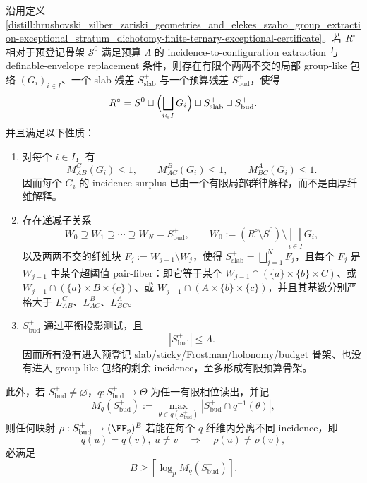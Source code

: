 \begin{theorem}\label{distill:hrushovski_zilber_zariski_geometries_and_elekes_szabo_group_extraction-exceptional_stratum_dichotomy-balanced-ternary-group-exceptional-decomposition}
沿用定义 \ref{distill:hrushovski_zilber_zariski_geometries_and_elekes_szabo_group_extraction-exceptional_stratum_dichotomy-finite-ternary-exceptional-certificate}。若 \(R^\circ\) 相对于预登记骨架 \(\mathcal S^0\) 满足预算 \(\Lambda\) 的 incidence-to-configuration extraction 与 definable-envelope replacement 条件，则存在有限个两两不交的局部 group-like 包络 \((G_i)_{i\in I}\)、一个 slab 残差 \(S_{\mathrm{slab}}^+\) 与一个预算残差 \(S_{\mathrm{bud}}^+\)，使得
\[
R^\circ
=
S^0\sqcup\Bigl(\bigsqcup_{i\in I}G_i\Bigr)\sqcup S_{\mathrm{slab}}^+\sqcup S_{\mathrm{bud}}^+.
\]
并且满足以下性质：
\begin{enumerate}
  \item 对每个 \(i\in I\)，有
  \[
  M_{AB}^{C}(G_i)\le 1,\qquad M_{AC}^{B}(G_i)\le 1,\qquad M_{BC}^{A}(G_i)\le 1.
  \]
  因而每个 \(G_i\) 的 incidence surplus 已由一个有限局部群律解释，而不是由厚纤维解释。
  \item 存在递减子关系
  \[
  W_0\supseteq W_1\supseteq\cdots\supseteq W_N=S_{\mathrm{bud}}^+,
  \qquad
  W_0:=(R^\circ\setminus S^0)\setminus\bigsqcup_{i\in I}G_i,
  \]
  以及两两不交的纤维块 \(F_j:=W_{j-1}\setminus W_j\)，使得
  \(S_{\mathrm{slab}}^+=\bigsqcup_{j=1}^{N}F_j\)，且每个 \(F_j\) 是 \(W_{j-1}\) 中某个超阈值 pair-fiber：即它等于某个
  \(W_{j-1}\cap(\{a\}\times\{b\}\times C)\)、或
  \(W_{j-1}\cap(\{a\}\times B\times\{c\})\)、或
  \(W_{j-1}\cap(A\times\{b\}\times\{c\})\)，并且其基数分别严格大于
  \(L_{AB}^{C}\)、\(L_{AC}^{B}\)、\(L_{BC}^{A}\)。
  \item \(S_{\mathrm{bud}}^+\) 通过平衡投影测试，且
  \[
  |S_{\mathrm{bud}}^+|\le \Lambda.
  \]
  因而所有没有进入预登记 slab/sticky/Frostman/holonomy/budget 骨架、也没有进入 group-like 包络的剩余 incidence，至多形成有限预算骨架。
\end{enumerate}
此外，若 \(S_{\mathrm{bud}}^+\ne\varnothing\)，\(q:S_{\mathrm{bud}}^+\to\Theta\) 为任一有限相位读出，并记
\[
M_q(S_{\mathrm{bud}}^+):=\max_{\theta\in q(S_{\mathrm{bud}}^+)} |S_{\mathrm{bud}}^+\cap q^{-1}(\theta)|,
\]
则任何映射 \(\rho:S_{\mathrm{bud}}^+\to(\FF_p)^B\) 若能在每个 \(q\)-纤维内分离不同 incidence，即
\[
q(u)=q(v),\ u\ne v\quad\Longrightarrow\quad \rho(u)\ne\rho(v),
\]
必满足
\[
B\ge \left\lceil \log_p M_q(S_{\mathrm{bud}}^+)\right\rceil.
\]
\end{theorem}

